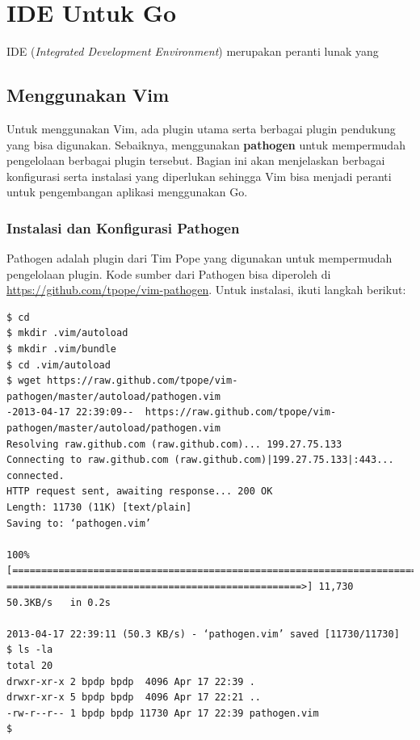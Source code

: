 \chapter{IDE Untuk Go}

IDE (\textit{Integrated Development Environment}) merupakan peranti lunak yang 

\section{Menggunakan Vim}

Untuk menggunakan Vim, ada plugin utama serta berbagai plugin pendukung yang bisa digunakan. Sebaiknya, menggunakan \textbf{pathogen} untuk mempermudah pengelolaan berbagai plugin tersebut. Bagian ini akan menjelaskan berbagai konfigurasi serta instalasi yang diperlukan sehingga Vim bisa menjadi peranti untuk pengembangan aplikasi menggunakan Go.

\subsection{Instalasi dan Konfigurasi Pathogen}

Pathogen adalah plugin dari Tim Pope yang digunakan untuk mempermudah pengelolaan plugin. Kode sumber dari Pathogen bisa diperoleh di \url{https://github.com/tpope/vim-pathogen}. Untuk instalasi, ikuti langkah berikut:

\begin{mdframed}[style=catatan]
\begin{verbatim}
$ cd
$ mkdir .vim/autoload
$ mkdir .vim/bundle
$ cd .vim/autoload
$ wget https://raw.github.com/tpope/vim-pathogen/master/autoload/pathogen.vim
-2013-04-17 22:39:09--  https://raw.github.com/tpope/vim-pathogen/master/autoload/pathogen.vim
Resolving raw.github.com (raw.github.com)... 199.27.75.133
Connecting to raw.github.com (raw.github.com)|199.27.75.133|:443... connected.
HTTP request sent, awaiting response... 200 OK
Length: 11730 (11K) [text/plain]
Saving to: ‘pathogen.vim’

100%[=========================================================================
===================================================>] 11,730      50.3KB/s   in 0.2s   

2013-04-17 22:39:11 (50.3 KB/s) - ‘pathogen.vim’ saved [11730/11730]
$ ls -la
total 20
drwxr-xr-x 2 bpdp bpdp  4096 Apr 17 22:39 .
drwxr-xr-x 5 bpdp bpdp  4096 Apr 17 22:21 ..
-rw-r--r-- 1 bpdp bpdp 11730 Apr 17 22:39 pathogen.vim
$ 
\end{verbatim}
\end{mdframed}


